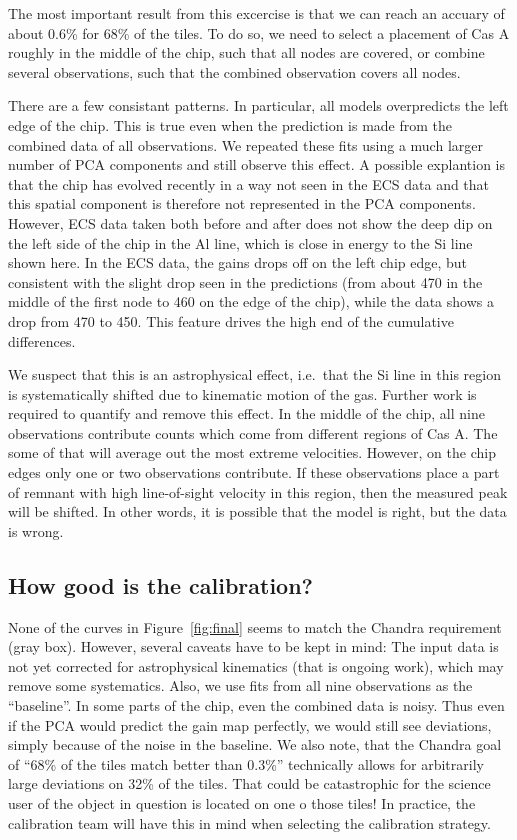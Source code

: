 \documentclass[]{spie}  %
\begin{document}
The most important result from this excercise is that we can reach an accuary of about 0.6\% for 68\% of the tiles. To do so, we need to select a placement of Cas A roughly in the middle of the chip, such that all nodes are covered, or combine several observations, such that the combined observation covers all nodes.

There are a few consistant patterns. In particular, all models overpredicts the left edge of the chip. This is true even when the prediction is made from the combined data of all observations. We repeated these fits using a much larger number of PCA components and still observe this effect. A possible explantion is that the chip has evolved recently in a way not seen in the ECS data and that this spatial component is therefore not represented in the PCA components. However, ECS data taken both before and after does not show the deep dip on the left side of the chip in the Al line, which is close in energy to the Si line shown here. In the ECS data, the gains drops off on the left chip edge, but consistent with the slight drop seen in the predictions (from about 470 in the middle of the first node to 460 on the edge of the chip), while the data shows a drop from 470 to 450. This feature drives the high end of the cumulative differences.

We suspect that this is an astrophysical effect, i.e.\ that the Si line in this region is systematically shifted due to kinematic motion of the gas. Further work is required to quantify and remove this effect. In the middle of the chip, all nine observations contribute counts which come from different regions of Cas A. The some of that will average out the most extreme velocities. However, on the chip edges only one or two observations contribute. If these observations place a part of remnant with high line-of-sight velocity in this region, then the measured peak will be shifted. In other words, it is possible that the model is right, but the data is wrong.

\subsection{How good is the calibration?}
None of the curves in Figure~\ref{fig:final} seems to match the Chandra requirement (gray box). However, several caveats have to be kept in mind: The input data is not yet corrected for astrophysical kinematics (that is ongoing work), which may remove some systematics. Also, we use fits from all nine observations as the ``baseline''. In some parts of the chip, even the combined data is noisy. Thus even if the PCA would predict the gain map perfectly, we would still see deviations, simply because of the noise in the baseline. We also note, that the Chandra goal of ``68\% of the tiles match better than 0.3\%'' technically allows for arbitrarily large deviations on 32\% of the tiles. That could be catastrophic for the science user of the object in question is located on one o those tiles! In practice, the calibration team will have this in mind when selecting the calibration strategy.
\end{document}
